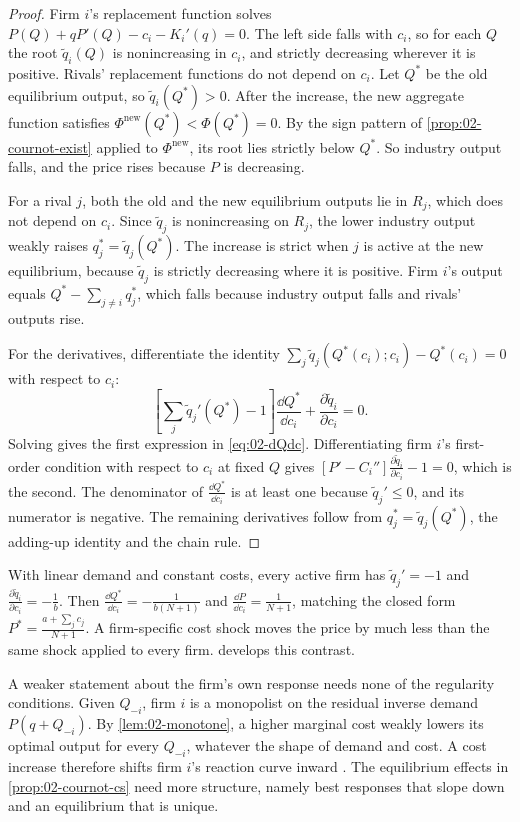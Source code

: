 \begin{proof}
Firm $i$'s replacement function solves $P(Q) + qP'(Q) - c_i - K_i'(q) = 0$. The left side falls with $c_i$, so for
each $Q$ the root $\tilde q_i(Q)$ is nonincreasing in $c_i$, and strictly decreasing wherever it is positive. Rivals'
replacement functions do not depend on $c_i$. Let $Q^*$ be the old equilibrium output, so $\tilde q_i(Q^*) > 0$.
After the increase, the new aggregate function satisfies $\Phi^{\mathrm{new}}(Q^*) < \Phi(Q^*) = 0$. By the sign
pattern of \cref{prop:02-cournot-exist} applied to $\Phi^{\mathrm{new}}$, its root lies strictly below $Q^*$. So
industry output falls, and the price rises because $P$ is decreasing.

For a rival $j$, both the old and the new equilibrium outputs lie in $R_j$, which does not depend on $c_i$. Since
$\tilde q_j$ is nonincreasing on $R_j$, the lower industry output weakly raises $q_j^* = \tilde q_j(Q^*)$. The
increase is strict when $j$ is active at the new equilibrium, because $\tilde q_j$ is strictly decreasing where it
is positive. Firm $i$'s output equals $Q^* - \sum_{j \ne i} q_j^*$, which falls because industry output falls and
rivals' outputs rise.

For the derivatives, differentiate the identity $\sum_j \tilde q_j(Q^*(c_i); c_i) - Q^*(c_i) = 0$ with respect to
$c_i$:
\[
  \left[\sum_j \tilde q_j'(Q^*) - 1\right]\frac{\dd Q^*}{\dd c_i} + \frac{\partial \tilde q_i}{\partial c_i} = 0 .
\]
Solving gives the first expression in \eqref{eq:02-dQdc}. Differentiating firm $i$'s first-order condition with
respect to $c_i$ at fixed $Q$ gives $\left[P' - C_i''\right]\frac{\partial \tilde q_i}{\partial c_i} - 1 = 0$, which
is the second. The denominator of $\frac{\dd Q^*}{\dd c_i}$ is at least one because $\tilde q_j' \le 0$, and its
numerator is negative. The remaining derivatives follow from $q_j^* = \tilde q_j(Q^*)$, the adding-up identity and
the chain rule.
\end{proof}

With linear demand and constant costs, every active firm has $\tilde q_j' = -1$ and $\frac{\partial \tilde
q_i}{\partial c_i} = -\frac{1}{b}$. Then $\frac{\dd Q^*}{\dd c_i} = -\frac{1}{b(N + 1)}$ and $\frac{\dd P}{\dd c_i} =
\frac{1}{N + 1}$, matching the closed form $P^* = \frac{a + \sum_j c_j}{N + 1}$. A firm-specific cost shock moves
the price by much less than the same shock applied to every firm.  develops this contrast.

A weaker statement about the firm's own response needs none of the regularity conditions. Given $Q_{-i}$, firm $i$ is
a monopolist on the residual inverse demand $P(q + Q_{-i})$. By \cref{lem:02-monotone}, a higher marginal cost weakly
lowers its optimal output for every $Q_{-i}$, whatever the shape of demand and cost. A cost increase therefore shifts
firm $i$'s reaction curve inward \citep[sec.~5.4]{Tirole1988}. The equilibrium effects in \cref{prop:02-cournot-cs}
need more structure, namely best responses that slope down and an equilibrium that is unique.

